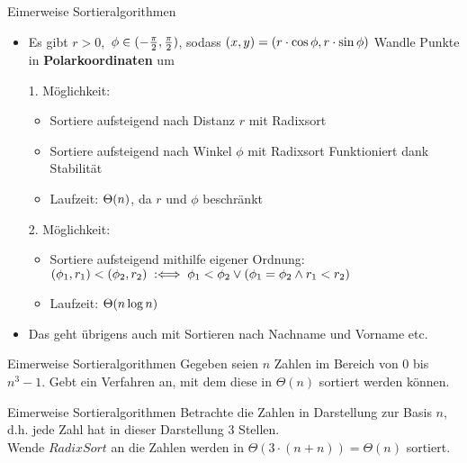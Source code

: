 \begin{frame}{Eimerweise Sortieralgorithmen}
	\solutionheading
	\begin{itemize}
		\item Es gibt $r > 0$,\, $\phi \in (-\fract \pi/2 , \fract \pi/2 )$, \; sodass \;  $(x, y) = (r \cdot \cos \phi, r \cdot \sin \phi)$
		\implitem Wandle Punkte in \textbf{Polarkoordinaten} um
		\pause
		\item[1.] Möglichkeit:
		\begin{itemize}
			\item Sortiere aufsteigend nach Distanz $r$ mit Radixsort
			\item Sortiere aufsteigend nach Winkel $\phi$ mit Radixsort 
			\implitem Funktioniert dank Stabilität
			\item Laufzeit: $\Theta\!\left(n\right)$, da $r$ und $\phi$ beschränkt
		\end{itemize}
		\pause
		\item[2.] Möglichkeit:
		\begin{itemize}
			\item Sortiere aufsteigend mithilfe eigener Ordnung: \\
			$(\phi_1, r_1) < (\phi_2, r_2) \Gdwdef \phi_1 < \phi_2 \lor (\phi_1 = \phi_2 \land r_1 < r_2)$
			\item Laufzeit: $\Theta\!\left(n \log n\right)$
		\end{itemize}
		\medskip
		\item Das geht übrigens auch mit Sortieren nach Nachname und Vorname etc. 
	\end{itemize}
\end{frame}

\begin{frame}{Eimerweise Sortieralgorithmen}
	Gegeben seien $n$ Zahlen im Bereich von $0$ bis $n^3 - 1$. Gebt ein Verfahren an, mit dem diese in $\Theta(n)$ sortiert werden können.
\end{frame}

\begin{frame}{Eimerweise Sortieralgorithmen}
	\solutionheading
	Betrachte die Zahlen in Darstellung zur Basis $n$, d.h. jede Zahl hat in dieser Darstellung 3 Stellen. \\ 
	Wende $RadixSort$ an \impl die Zahlen werden in $\Theta(3 \cdot (n + n)) = \Theta(n)$ sortiert.
\end{frame}


